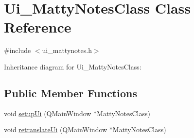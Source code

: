 \hypertarget{classUi__MattyNotesClass}{}\section{Ui\+\_\+\+Matty\+Notes\+Class Class Reference}
\label{classUi__MattyNotesClass}


{\ttfamily \#include $<$ui\+\_\+mattynotes.\+h$>$}



Inheritance diagram for Ui\+\_\+\+Matty\+Notes\+Class\+:
\subsection*{Public Member Functions}
\begin{DoxyCompactItemize}
\item 
void \hyperlink{classUi__MattyNotesClass_a33a88ea08595a64d445a104fcdfb4e7c}{setup\+Ui} (Q\+Main\+Window $\ast$Matty\+Notes\+Class)
\item 
void \hyperlink{classUi__MattyNotesClass_a3a5915db60e9488bd96bf4ea0c844422}{retranslate\+Ui} (Q\+Main\+Window $\ast$Matty\+Notes\+Class)
\end{DoxyCompactItemize}
